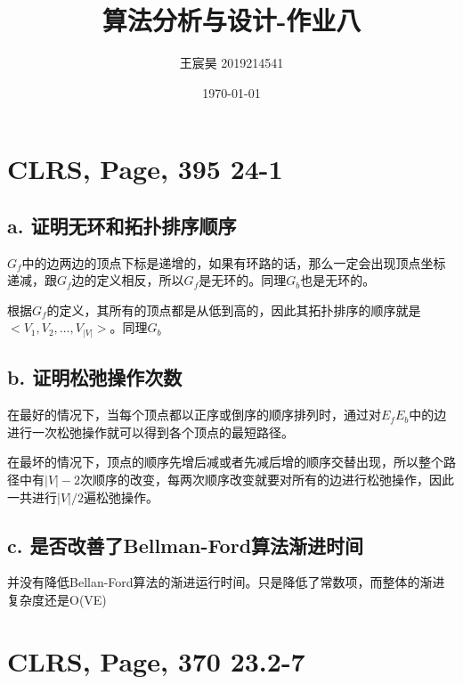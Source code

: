 \documentclass[UTF8]{ctexart}
\title{算法分析与设计-作业八}
\author{王宸昊 2019214541}
\date{\today}
\begin{document}
\maketitle


\section{CLRS, Page, 395 24-1}

\subsection{a. 证明无环和拓扑排序顺序}

$G_f$中的边两边的顶点下标是递增的，如果有环路的话，那么一定会出现顶点坐标递减，跟$G_f$边的定义相反，所以$G_f$是无环的。同理$G_b$也是无环的。

根据$G_f$的定义，其所有的顶点都是从低到高的，因此其拓扑排序的顺序就是$<V_1, V_2, \dots, V_{|V|}>$。同理$G_b$

\subsection{b. 证明松弛操作次数}

在最好的情况下，当每个顶点都以正序或倒序的顺序排列时，通过对$E_f$$E_b$中的边进行一次松弛操作就可以得到各个顶点的最短路径。

在最坏的情况下，顶点的顺序先增后减或者先减后增的顺序交替出现，所以整个路径中有$|V|-2$次顺序的改变，每两次顺序改变就要对所有的边进行松弛操作，因此一共进行$|V|/2$遍松弛操作。

\subsection{c. 是否改善了Bellman-Ford算法渐进时间}

并没有降低Bellan-Ford算法的渐进运行时间。只是降低了常数项，而整体的渐进复杂度还是O(VE)



\section{CLRS, Page, 370 23.2-7}
\end{document}
